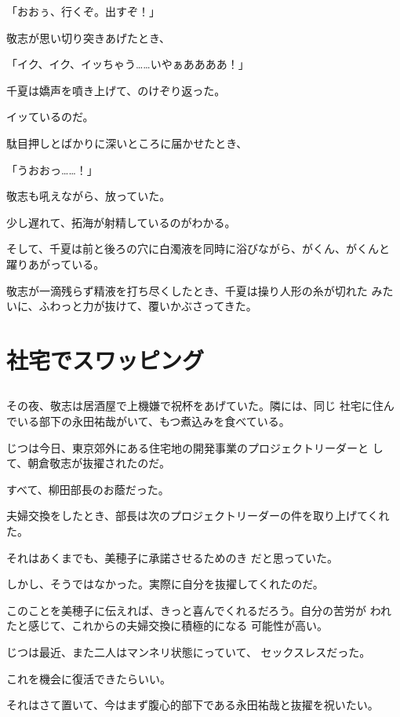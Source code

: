﻿\documentclass[
    book,tate,
    line_length=30zw,
    jafontsize=12pt,
    paper=b5j,
    landscape,
    ]{jlreq}
\begin{document}
「おおぅ、行くぞ。出すぞ！」

敬志が思い切り突きあげたとき、

「イク、イク、イッちゃう……いやぁああああ！」

千夏は嬌声を噴き上げて、のけぞり返った。

イッているのだ。

駄目押しとばかりに深いところに届かせたとき、

「うおおっ……！」

敬志も吼えながら、放っていた。

少し遅れて、拓海が射精しているのがわかる。

そして、千夏は前と後ろの穴に白濁液を同時に浴びながら、がくん、がくんと
躍りあがっている。

敬志が一滴残らず精液を打ち尽くしたとき、千夏は操り人形の糸が切れた
みたいに、ふわっと力が抜けて、覆いかぶさってきた。

\chapter{社宅でスワッピング}

\section*{}

その夜、敬志は居酒屋で上機嫌で祝杯をあげていた。隣には、同じ
社宅に住んでいる部下の永田祐哉がいて、もつ煮込みを食べている。

じつは今日、東京郊外にある住宅地の開発事業のプロジェクトリーダーと
して、朝倉敬志が抜擢されたのだ。

すべて、柳田部長のお蔭だった。

夫婦交換をしたとき、部長は次のプロジェクトリーダーの件を取り上げてくれた。

それはあくまでも、美穂子に承諾させるためのき
だと思っていた。

しかし、そうではなかった。実際に自分を抜擢してくれたのだ。

このことを美穂子に伝えれば、きっと喜んでくれるだろう。自分の苦労が
われたと感じて、これからの夫婦交換に積極的になる
可能性が高い。

じつは最近、また二人はマンネリ状態にっていて、
セックスレスだった。

これを機会に復活できたらいい。

それはさて置いて、今はまず腹心的部下である永田祐哉と抜擢を祝いたい。
\end{document}
